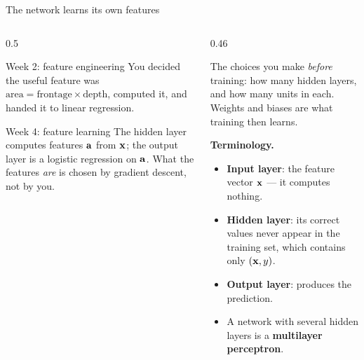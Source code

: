 \documentclass[aspectratio=169,10pt]{beamer}
\begin{document}
\begin{frame}{The network learns its own features}
  \begin{columns}[T,onlytextwidth]
    \begin{column}{0.5\textwidth}
      \begin{block}{Week 2: feature engineering}
        \footnotesize
        You decided the useful feature was $\text{area}=\text{frontage}\times\text{depth}$,
        computed it, and handed it to linear regression.
      \end{block}
      \begin{block}{Week 4: feature learning}
        \footnotesize
        The hidden layer computes features $\mathbf{a}$ from $\mathbf{x}$; the output layer is a logistic
        regression on $\mathbf{a}$. What the features \emph{are} is chosen by gradient descent, not
        by you.
      \end{block}
      \begin{center}
        \footnotesize
      \end{center}
    \end{column}
    \begin{column}{0.46\textwidth}
      \begin{defnbox}[Architecture]
        \small
        The choices you make \emph{before} training: how many hidden layers, and how many
        units in each. Weights and biases are what training then learns.
      \end{defnbox}
      \footnotesize
      \textbf{Terminology.}
      \begin{itemize}
        \item \textbf{Input layer}: the feature vector $\mathbf{x}$ --- it computes nothing.
        \item \textbf{Hidden layer}: its correct values never appear in the training set,
              which contains only $(\mathbf{x},y)$.
        \item \textbf{Output layer}: produces the prediction.
        \item A network with several hidden layers is a \textbf{multilayer perceptron}.
      \end{itemize}
    \end{column}
  \end{columns}
\end{frame}
\end{document}
